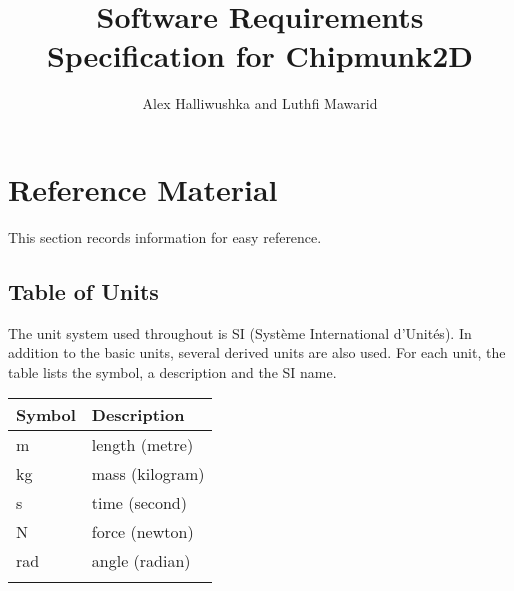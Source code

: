 \documentclass[12pt]{article}
\title{Software Requirements Specification for Chipmunk2D}
\author{Alex Halliwushka and Luthfi Mawarid}
\begin{document}
\maketitle
\tableofcontents
\newpage
\section{Reference Material}
\label{Sec:RefeMate}
This section records information for easy reference.
\subsection{Table of Units}
\label{Sec:TablofUnit}
The unit system used throughout is SI (Syst\`{e}me International d'Unit\'{e}s). In addition to the basic units, several derived units are also used. For each unit, the table lists the symbol, a description and the SI name.
\begin{longtable*}{l l}
\toprule
Symbol & Description
\\
\midrule
m & length (metre)
\\
kg & mass (kilogram)
\\
s & time (second)
\\
N & force (newton)
\\
rad & angle (radian)
\\
\bottomrule
\label{Table:TablofUnit}
\end{longtable*}
\end{document}
